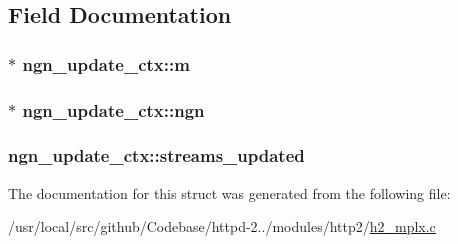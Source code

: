 \subsection{Field Documentation}
\subsubsection[{\texorpdfstring{m}{m}}]{$\ast$ ngn\+\_\+update\+\_\+ctx\+::m}\hypertarget{structngn__update__ctx_a1783579b7dde81ab42def42abd3fbbd1}{}\label{structngn__update__ctx_a1783579b7dde81ab42def42abd3fbbd1}
\subsubsection[{\texorpdfstring{ngn}{ngn}}]{$\ast$ ngn\+\_\+update\+\_\+ctx\+::ngn}\hypertarget{structngn__update__ctx_a2bd6ee9f94b233ecdb05dc9d08911fee}{}\label{structngn__update__ctx_a2bd6ee9f94b233ecdb05dc9d08911fee}
\subsubsection[{\texorpdfstring{streams\+\_\+updated}{streams_updated}}]{ ngn\+\_\+update\+\_\+ctx\+::streams\+\_\+updated}\hypertarget{structngn__update__ctx_ae3420629f06b39e59db049b08d6d6e58}{}\label{structngn__update__ctx_ae3420629f06b39e59db049b08d6d6e58}


The documentation for this struct was generated from the following file\+:\begin{DoxyCompactItemize}
\item 
/usr/local/src/github/\+Codebase/httpd-\/2../modules/http2/\hyperlink{h2__mplx_8c}{h2\+\_\+mplx.\+c}\end{DoxyCompactItemize}
